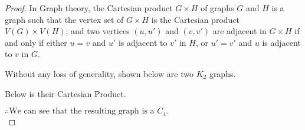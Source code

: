 \documentclass{article}
\begin{document}
\begin{proof}
    In Graph theory, the Cartesian product 
    $G \times H$ of graphs $G$ and $H$ is a graph such that the vertex set
    of $G \times H$ is the Cartesian product $V(G) \times V(H)$; and two vertices $(u,u')$ and $(v,v')$ are adjacent in $G \times H$ if and only if either $u = v$ and $u'$ is adjacent to $v'$ in $H$, or $u' = v'$ and $u$ is adjacent to $v$ in $G$.
    
    Without any loss of generality, shown below are two $K_2$ graphs. \\
    
   \begin{center}

            \end{center}
            \pagebreak
            Below is their Cartesian Product.
            
            \begin{center}
            
    \end{center}
    $\therefore \text{We can see that the resulting graph is a $C_4$.}$\\
\end{proof}
\end{document}
